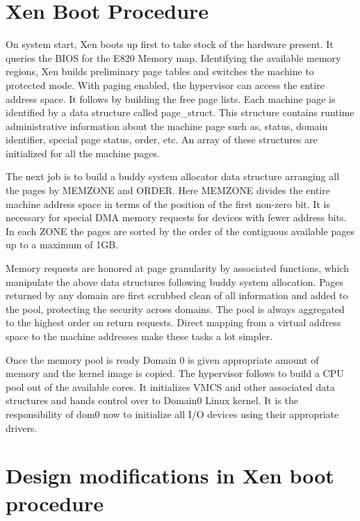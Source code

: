 \section{Xen Boot Procedure}

 

On system start, Xen boots up first to take stock of the hardware present. It queries the BIOS for the E820 Memory map. Identifying the available memory regions, Xen builds preliminary page tables and switches the machine to protected mode. With paging enabled, the hypervisor can access the entire address space. It follows by building the free page lists. Each machine page is identified by a data structure called page\_struct. This structure contains runtime administrative information about the machine page such as, status, domain identifier, special page status, order, etc. An array of these structures are initialized for all the machine pages. 

 

The next job is to build a buddy system allocator data structure arranging all the pages by MEMZONE and ORDER. Here MEMZONE divides the entire machine address space in terms of the position of the first non-zero bit. It is necessary for special DMA memory requests for devices with fewer address bits. In each ZONE the pages are sorted by the order of the contiguous available pages up to a maximum of 1GB. 

 

Memory requests are honored at page granularity by associated functions, which manipulate the above data structures following buddy system allocation. Pages returned by any domain are first scrubbed clean of all information and added to the pool, protecting the security across domains. The pool is always aggregated to the highest order on return requests. Direct mapping from a virtual address space to the machine addresses make these tasks a lot simpler. 

 

Once the memory pool is ready Domain 0 is given appropriate amount of memory and the kernel image is copied. The hypervisor follows to build a CPU pool out of the available cores. It initializes VMCS and other associated data structures and hands control over to Domain0 Linux kernel. It is the responsibility of dom0 now to initialize all I/O devices using their appropriate drivers. 

 

\section{Design modifications in Xen boot procedure}

